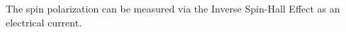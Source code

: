 The spin polarization can be measured via the Inverse Spin-Hall Effect
\cite{ISHE} as an electrical current.


%

